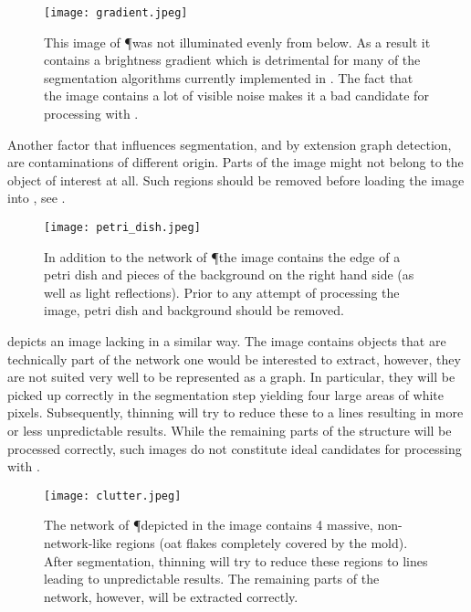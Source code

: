 	\begin{figure}
		\centering
		\texttt{[image: gradient.jpeg]}
		\caption[\NEFIs caveats - Gradients]{This image of \P was not illuminated evenly from below. As a result it contains a brightness gradient which is detrimental for many of the segmentation algorithms currently implemented in \NEFI. The fact that the image contains a lot of visible noise makes it a bad candidate for processing with \NEFI.}
		\label{fig:sup:gradient}
	\end{figure}

	Another factor that influences segmentation, and by extension graph detection, are contaminations of different origin. Parts of the image might not belong to the object of interest at all. Such regions should be removed before loading the image into \NEFI, see . 

	\begin{figure}
		\centering
		\texttt{[image: petri\_dish.jpeg]}
		\caption[\NEFIs caveats - Non-network objects]{In addition to the network of \P the image contains the edge of a petri dish and pieces of the background on the right hand side (as well as light reflections). Prior to any attempt of processing the image, petri dish and background should be removed.}
		\label{fig:sup:petri_dish}
	\end{figure}

	 depicts an image lacking in a similar way. The image contains objects that are technically part of the network one would be interested to extract, however, they are not suited very well to be represented as a graph. In particular, they will be picked up correctly in the segmentation step yielding four large areas of white pixels. Subsequently, thinning will try to reduce these to a lines resulting in more or less unpredictable results. While the remaining parts of the structure will be processed correctly, such images do not constitute ideal candidates for processing with \NEFI.

	\begin{figure}
		\centering
		\texttt{[image: clutter.jpeg]}
		\caption[\NEFIs caveats - Non-network objects]{The network of \P depicted in the image contains 4 massive, non-network-like regions (oat flakes completely covered by the mold). After segmentation, thinning will try to reduce these regions to lines leading to unpredictable results. The remaining parts of the network, however, will be extracted correctly.}
		\label{fig:sup:clutter}
	\end{figure}


